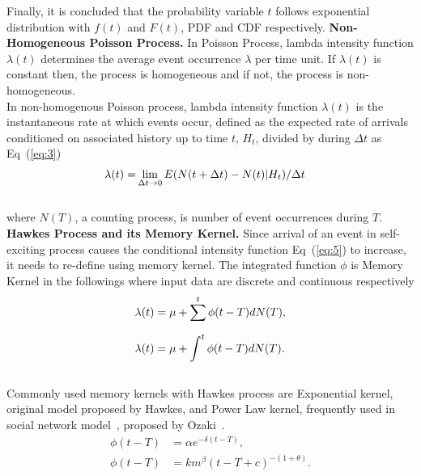 \documentclass[10pt,letterpaper]{article}
\begin{document}
Finally, it is concluded that the probability variable $t$ follows exponential distribution with $f(t)$ and $F(t)$, PDF and CDF respectively.
\newline
\newline
\textbf{Non-Homogeneous Poisson Process.		}
In Poisson Process, lambda intensity function $\lambda(t)$ determines the average event occurrence $\lambda$ per time unit. If $\lambda(t)$ is constant then, the process is homogeneous and if not, the process is non-homogeneous.\\
In non-homogenous Poisson process, lambda intensity function $\lambda(t)$ is the instantaneous rate at which events occur, defined as the expected rate of arrivals conditioned on associated history up to time $t$, $H_t$, divided by during $\Delta t$ as Eq~(\ref{eq:3}) 
\begin{align}
\label{eq:5}
\centering
\lambda(t)=&\lim_{\Delta t\rightarrow 0}E(N(t+\Delta t)-N(t)|H_t)/\Delta t
\end{align}	
\\where $N(T)$, a counting process, is number of event occurrences during $T$.\newline\newline
\textbf{Hawkes Process and its Memory Kernel.	}
Since arrival of an event in self-exciting process causes the conditional intensity function Eq~(\ref{eq:5}) to increase, it needs to re-define using memory kernel. The integrated function $\phi$ is Memory Kernel in the followings where input data are discrete and continuous respectively
\begin{align}
\centering
\lambda(t)&=\mu +\sum_{}^{t}\phi(t-T)dN(T), \nonumber \\
\lambda(t)&=\mu +\int_{}^{t}\phi(t-T)dN(T). \nonumber
\end{align}   
\\ Commonly used memory kernels with Hawkes process are Exponential kernel, original model proposed by Hawkes, and Power Law kernel, frequently used in social network model~\cite{bib11, bib12, bib13}, proposed by Ozaki~\cite{bib14}.
\begin{align}
\label{eq:6}
\phi(t-T)&=\alpha e^{-\delta(t-T)}, \\
\label{eq:7}	
\phi(t-T)&=km^\beta(t-T+c)^{-(1+\theta)}. 
\end{align}   
\end{document}
